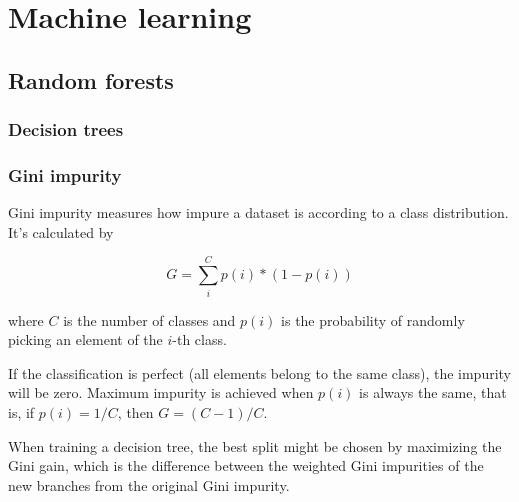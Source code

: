 \chapter{Machine learning}

\section{Random forests}

\subsection{Decision trees}

\subsection{Gini impurity}

Gini impurity measures how impure a dataset is according to a class distribution. It's calculated by

\[G = \sum_i^C p(i) * (1 - p(i))\]

where \(C\) is the number of classes and \(p(i)\) is the probability of randomly picking an element of the \(i\)-th class.

If the classification is perfect (all elements belong to the same class), the impurity will be zero. Maximum impurity is achieved when \(p(i)\) is always the same, that is, if \(p(i) = 1 / C\), then \(G = (C - 1) / C\).

When training a decision tree, the best split might be chosen by maximizing the Gini gain, which is the difference between the weighted Gini impurities of the new branches from the original Gini impurity.
